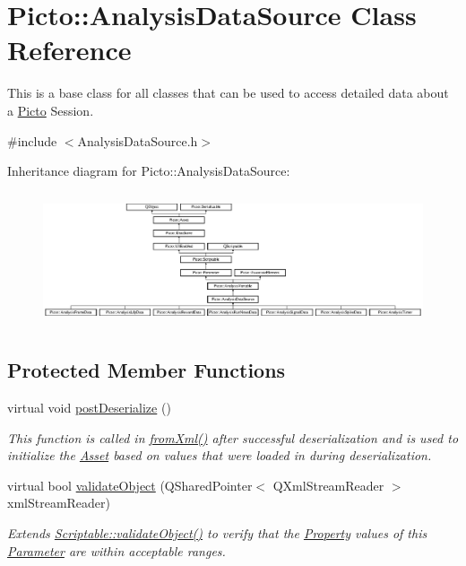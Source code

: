 \hypertarget{class_picto_1_1_analysis_data_source}{\section{Picto\-:\-:Analysis\-Data\-Source Class Reference}
\label{class_picto_1_1_analysis_data_source}
}


This is a base class for all classes that can be used to access detailed data about a \hyperlink{namespace_picto}{Picto} Session.  




{\ttfamily \#include $<$Analysis\-Data\-Source.\-h$>$}

Inheritance diagram for Picto\-:\-:Analysis\-Data\-Source\-:\begin{figure}[H]
\begin{center}
\leavevmode
\includegraphics[height=3.956044cm]{class_picto_1_1_analysis_data_source}
\end{center}
\end{figure}
\subsection*{Protected Member Functions}
\begin{DoxyCompactItemize}
\item 
virtual void \hyperlink{class_picto_1_1_analysis_data_source_a491e202caec7a1d9f9a0c7466f962f18}{post\-Deserialize} ()
\begin{DoxyCompactList}\small\item\em This function is called in \hyperlink{class_picto_1_1_asset_a8bed4da09ecb1c07ce0dab313a9aba67}{from\-Xml()} after successful deserialization and is used to initialize the \hyperlink{class_picto_1_1_asset}{Asset} based on values that were loaded in during deserialization. \end{DoxyCompactList}\item 
virtual bool \hyperlink{class_picto_1_1_analysis_data_source_a8d43777d1a7d1b1467c9df205d118bb3}{validate\-Object} (Q\-Shared\-Pointer$<$ Q\-Xml\-Stream\-Reader $>$ xml\-Stream\-Reader)
\begin{DoxyCompactList}\small\item\em Extends \hyperlink{class_picto_1_1_scriptable_ab6e2944c43a3b5d418bf7b251594386d}{Scriptable\-::validate\-Object()} to verify that the \hyperlink{class_picto_1_1_property}{Property} values of this \hyperlink{class_picto_1_1_parameter}{Parameter} are within acceptable ranges. \end{DoxyCompactList}\end{DoxyCompactItemize}
